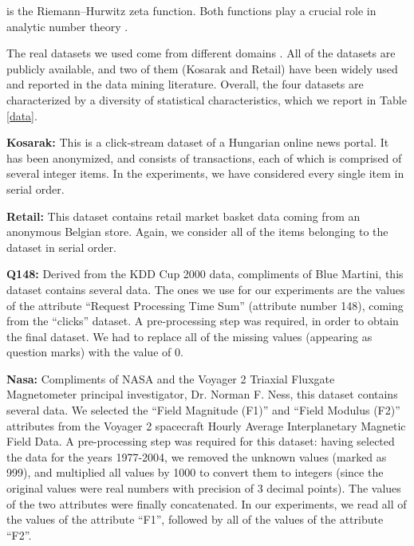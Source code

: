 \documentclass[final,3p,times]{elsarticle}
\begin{document}
\noindent is the Riemann--Hurwitz zeta function. Both functions play a crucial role in analytic number theory \cite{iwaniec-kowalski} \cite{Tempesta}. 

The real datasets we used come from different domains \cite{Dallachiesa}. All of the datasets are publicly available, and two of them (Kosarak and Retail) have been widely used and reported in the data mining literature. Overall, the four datasets are characterized by a diversity of statistical characteristics, which we report in Table \ref{data}. 

\textbf{Kosarak:} This is a click-stream dataset of a Hungarian online news portal. It has been anonymized, and consists of transactions, each of which is comprised of several integer items. In the experiments, we have considered every single item in serial order.

\textbf{Retail:} This dataset contains retail market basket data coming from an anonymous Belgian store. Again, we consider all of the items belonging to the dataset in serial order.

\textbf{Q148:} Derived from the KDD Cup 2000 data, compliments of Blue Martini, this dataset contains several data. The ones we use for our experiments are the values of the attribute “Request Processing Time Sum” (attribute number 148), coming from the ``clicks'' dataset. A pre-processing step was required, in order to obtain the final dataset. We had to replace all of the missing values (appearing as question marks) with the value of 0.

\textbf{Nasa:} Compliments of NASA and the Voyager 2 Triaxial Fluxgate Magnetometer principal investigator, Dr. Norman F. Ness, this dataset contains several data. We selected the “Field Magnitude (F1)” and “Field Modulus (F2)” attributes from the Voyager 2 spacecraft Hourly Average Interplanetary Magnetic Field Data. A pre-processing step was required for this dataset: having selected the data for the years 1977-2004, we removed the unknown values (marked as 999), and multiplied all values by 1000 to convert them to integers (since the original values were real numbers with precision of 3 decimal points). The values of the two attributes were finally concatenated. In our experiments, we read all of the values of the attribute “F1”, followed by all of the values of the attribute “F2”.
\end{document}
